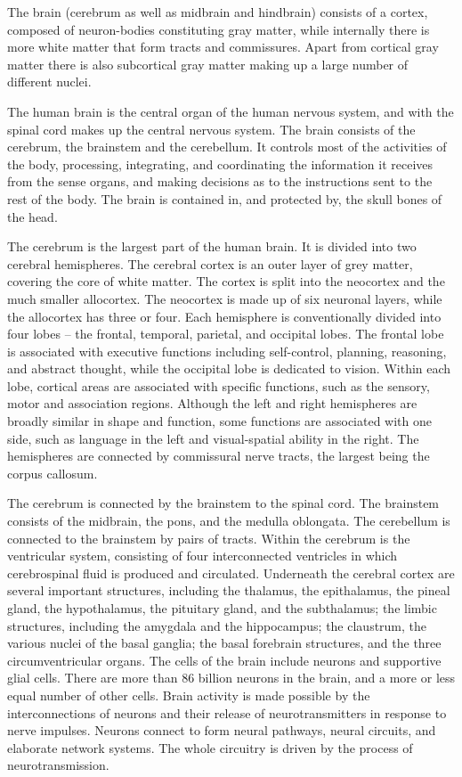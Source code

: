 The brain (cerebrum as well as midbrain and hindbrain) consists of a cortex, composed of neuron-bodies constituting gray matter, while internally there is more white matter that form tracts and commissures. Apart from cortical gray matter there is also subcortical gray matter making up a large number of different nuclei.

The human brain is the central organ of the human nervous system, and with the spinal cord makes up the central nervous system. The brain consists of the cerebrum, the brainstem and the cerebellum. It controls most of the activities of the body, processing, integrating, and coordinating the information it receives from the sense organs, and making decisions as to the instructions sent to the rest of the body. The brain is contained in, and protected by, the skull bones of the head.

The cerebrum is the largest part of the human brain. It is divided into two cerebral hemispheres. The cerebral cortex is an outer layer of grey matter, covering the core of white matter. The cortex is split into the neocortex and the much smaller allocortex. The neocortex is made up of six neuronal layers, while the allocortex has three or four. Each hemisphere is conventionally divided into four lobes -- the frontal, temporal, parietal, and occipital lobes. The frontal lobe is associated with executive functions including self-control, planning, reasoning, and abstract thought, while the occipital lobe is dedicated to vision. Within each lobe, cortical areas are associated with specific functions, such as the sensory, motor and association regions. Although the left and right hemispheres are broadly similar in shape and function, some functions are associated with one side, such as language in the left and visual-spatial ability in the right. The hemispheres are connected by commissural nerve tracts, the largest being the corpus callosum.

The cerebrum is connected by the brainstem to the spinal cord. The brainstem consists of the midbrain, the pons, and the medulla oblongata. The cerebellum is connected to the brainstem by pairs of tracts. Within the cerebrum is the ventricular system, consisting of four interconnected ventricles in which cerebrospinal fluid is produced and circulated. Underneath the cerebral cortex are several important structures, including the thalamus, the epithalamus, the pineal gland, the hypothalamus, the pituitary gland, and the subthalamus; the limbic structures, including the amygdala and the hippocampus; the claustrum, the various nuclei of the basal ganglia; the basal forebrain structures, and the three circumventricular organs. The cells of the brain include neurons and supportive glial cells. There are more than 86 billion neurons in the brain, and a more or less equal number of other cells. Brain activity is made possible by the interconnections of neurons and their release of neurotransmitters in response to nerve impulses. Neurons connect to form neural pathways, neural circuits, and elaborate network systems. The whole circuitry is driven by the process of neurotransmission.

